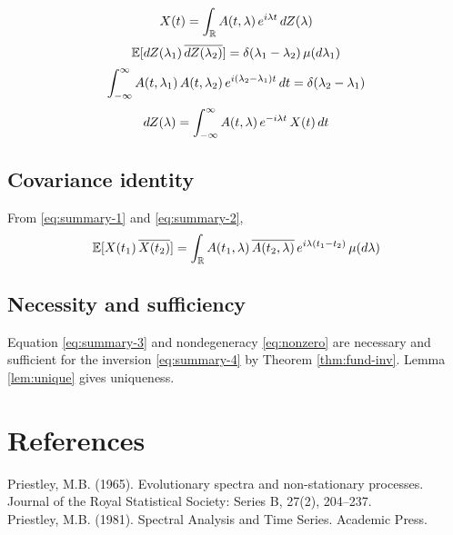 \documentclass{article}
\begin{document}
\begin{equation}
  \label{eq:summary-1} X (t) = \int_{\mathbb{R}} A (t, \lambda) 
  \hspace{0.17em} e^{i \lambda t}  \hspace{0.17em} dZ (\lambda)
\end{equation}
\begin{equation}
  \label{eq:summary-2} \mathbb{E} [dZ (\lambda_1) \hspace{0.17em} \overline{dZ
  (\lambda_2)}] = \delta (\lambda_1 - \lambda_2)  \hspace{0.17em} \mu (d
  \lambda_1)
\end{equation}
\begin{equation}
  \label{eq:summary-3} \int_{- \infty}^{\infty} A (t, \lambda_1) 
  \hspace{0.17em} A (t, \lambda_2)  \hspace{0.17em} e^{i (\lambda_2 -
  \lambda_1) t}  \hspace{0.17em} dt = \delta (\lambda_2 - \lambda_1)
\end{equation}
\begin{equation}
  \label{eq:summary-4} dZ (\lambda) = \int_{- \infty}^{\infty} A (t, \lambda) 
  \hspace{0.17em} e^{- i \lambda t}  \hspace{0.17em} X (t)  \hspace{0.17em} dt
\end{equation}

\subsection*{Covariance identity}

From \eqref{eq:summary-1} and \eqref{eq:summary-2},
\begin{equation}
  \label{eq:cov-id} \mathbb{E} [X (t_1) \hspace{0.17em} \overline{X (t_2)}] =
  \int_{\mathbb{R}} A (t_1, \lambda) \hspace{0.17em} \overline{A (t_2,
  \lambda)} \hspace{0.17em} e^{i \lambda (t_1 - t_2)}  \hspace{0.17em} \mu (d
  \lambda)
\end{equation}

\subsection*{Necessity and sufficiency}

Equation \eqref{eq:summary-3} and nondegeneracy \eqref{eq:nonzero} are
necessary and sufficient for the inversion \eqref{eq:summary-4} by Theorem
\ref{thm:fund-inv}. Lemma \ref{lem:unique} gives uniqueness.

\section{References}

{\noindent}Priestley, M.B. (1965). Evolutionary spectra and non-stationary
processes. Journal of the Royal Statistical Society: Series B, 27(2),
204--237.\\
Priestley, M.B. (1981). Spectral Analysis and Time Series. Academic Press.
\end{document}
